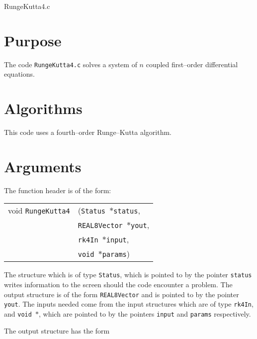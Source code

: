 \documentclass[12pt]{article}
\begin{document}
\huge
\begin{center}
RungeKutta4.c
\end{center}
\normalsize
\vspace{10mm}

\section{Purpose}

The code \texttt{RungeKutta4.c} solves a system of $n$ coupled first--order differential equations.



\section{Algorithms}

This code uses a fourth--order Runge--Kutta algorithm.


\section{Arguments}

The function header is of the form:

\vspace{5mm}

\begin{tabular}{ll}
void \texttt{RungeKutta4}&(\texttt{Status $\ast$status},     \\
                                   &\texttt{REAL8Vector $\ast$yout}, \\
                                   &\texttt{rk4In $\ast$input}, \\
                                   &\texttt{void $\ast$params})
\end{tabular}

\vspace{5mm}

The structure which is of type \texttt{Status}, which is pointed to by the pointer \texttt{status} writes information to the screen should the code encounter a problem. The output structure is of the form \texttt{REAL8Vector} and is pointed to by the pointer \texttt{yout}. 
The inputs needed come from the input structures which are of type \texttt{rk4In}, and \texttt{void $\ast$}, which are pointed to by the pointers \texttt{input} and \texttt{params} respectively.

The output structure has the form

\vspace{5mm}
\end{document}
